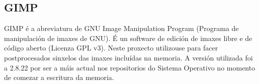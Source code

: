 \subsection{GIMP}

GIMP é a abreviatura de GNU Image Manipulation Program (Programa de manipulación de imaxes de GNU). É un software de edición de imaxes libre e de código aberto (Licenza GPL v3\cite{gimp}). Neste proxecto utilizouse para facer postprocesados sinxelos das imaxes incluídas na memoria. A versión utilizada foi a 2.8.22 por ser a máis actual nos repositorios do Sistema Operativo no momento de comezar a escritura da memoria.

